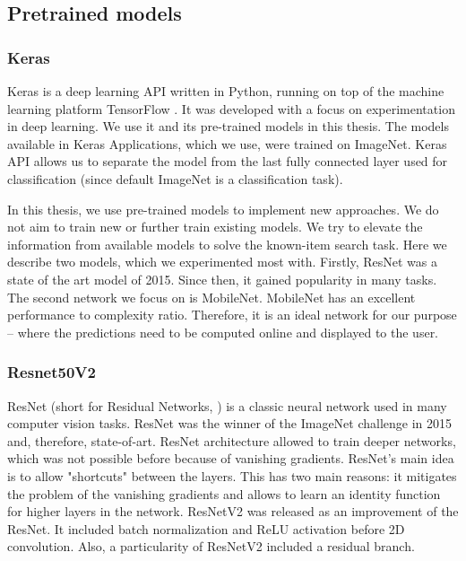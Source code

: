 \subsection{Pretrained models}
\label{ss:pretrained_models}

\subsubsection{Keras}

Keras \citep{chollet2015keras} is a deep learning API written in Python, running on top of the machine learning platform TensorFlow \citep{tensorflow2015-whitepaper}. It was developed with a focus on experimentation in deep learning. We use it and its pre-trained models in this thesis. The models available in Keras Applications, which we use, were trained on ImageNet. Keras API allows us to separate the model from the last fully connected layer used for classification (since default ImageNet is a classification task). 

In this thesis, we use pre-trained models to implement new approaches. We do not aim to train new or further train existing models. We try to elevate the information from available models to solve the known-item search task. Here we describe two models, which we experimented most with. Firstly, ResNet was a state of the art model of 2015. Since then, it gained popularity in many tasks. The second network we focus on is MobileNet. MobileNet has an excellent performance to complexity ratio. Therefore, it is an ideal network for our purpose -- where the predictions need to be computed online and displayed to the user.

\subsubsection*{Resnet50V2}

ResNet (short for Residual Networks, \cite{resnet}) is a classic neural network used in many computer vision tasks. ResNet was the winner of the ImageNet challenge in 2015 and, therefore, state-of-art. ResNet architecture allowed to train deeper networks, which was not possible before because of vanishing gradients. ResNet's main idea is to allow "shortcuts" between the layers. This has two main reasons: it mitigates the problem of the vanishing gradients and allows to learn an identity function for higher layers in the network. ResNetV2 \citep{resnetv2} was released as an improvement of the ResNet. It included batch normalization and ReLU activation before 2D convolution. Also, a particularity of ResNetV2 included a residual branch.

